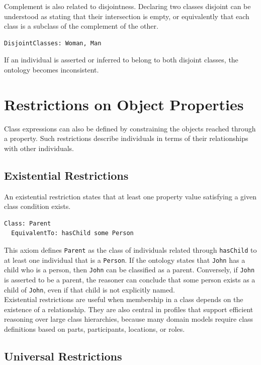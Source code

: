 \documentclass{scrbook}
\begin{document}
	Complement is also related to disjointness. Declaring two classes disjoint can be understood as stating that their intersection is empty, or equivalently that each class is a subclass of the complement of the other.
	
	\begin{lstlisting}
DisjointClasses: Woman, Man
	\end{lstlisting}
	
	If an individual is asserted or inferred to belong to both disjoint classes, the ontology becomes inconsistent.
	
	\section{Restrictions on Object Properties}
	
	Class expressions can also be defined by constraining the objects reached through a property. Such restrictions describe individuals in terms of their relationships with other individuals.
	
	\subsection{Existential Restrictions}
	
	An existential restriction states that at least one property value satisfying a given class condition exists.
	
	\begin{lstlisting}
Class: Parent
  EquivalentTo: hasChild some Person
	\end{lstlisting}
	
	This axiom defines \texttt{Parent} as the class of individuals related through \texttt{hasChild} to at least one individual that is a \texttt{Person}. If the ontology states that \texttt{John} has a child who is a person, then \texttt{John} can be classified as a parent. Conversely, if \texttt{John} is asserted to be a parent, the reasoner can conclude that some person exists as a child of \texttt{John}, even if that child is not explicitly named.\\
	
	Existential restrictions are useful when membership in a class depends on the existence of a relationship. They are also central in profiles that support efficient reasoning over large class hierarchies, because many domain models require class definitions based on parts, participants, locations, or roles.
	
	\subsection{Universal Restrictions}
	
\end{document}
